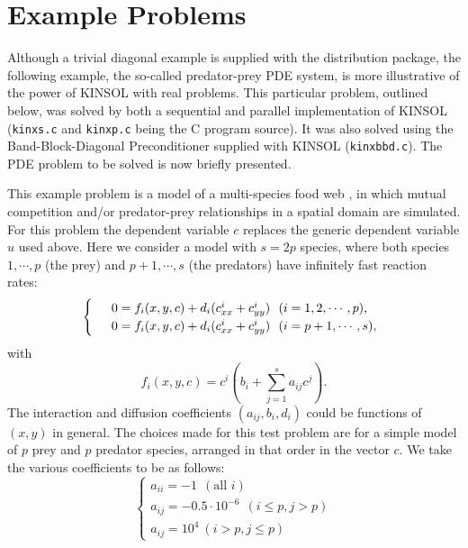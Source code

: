 \section{Example Problems}


Although a trivial diagonal example is supplied with the distribution package, 
the following example,  the so-called predator-prey PDE system, is more 
illustrative of the power of KINSOL with real problems. This particular 
problem, outlined below, was solved by both a sequential and parallel
implementation of KINSOL ({\tt kinxs.c} and {\tt kinxp.c} being the C program 
source). It was also solved using the Band-Block-Diagonal Preconditioner 
supplied with KINSOL ({\tt kinxbbd.c}). The PDE problem to be solved is now 
briefly presented.

This example problem is a model of a multi-species food web \cite{Br86},
in which mutual competition and/or predator-prey relationships in a
spatial domain are simulated. For this problem the dependent variable $c$ 
replaces the generic dependent variable $u$ used above. Here we consider a 
model with $s = 2p$ species, where both species $1,\cdots , p$ (the
prey) and $p+1,\cdots, s$ (the predators) have infinitely fast reaction
rates:
\begin{equation}
\renewcommand{\arraystretch}{1.2}
\left\{
\begin{array}{l}
               \hspace*{1em}  0 = f_i(x,y,c) + d_i 
( c^i_{xx} + c^i_{yy} ) ~ ~ (i = 1,2,\cdots,p) , \\
               \hspace*{1em}  0 = f_i(x,y,c) + d_i 
( c^i_{xx} + c^i_{yy} ) ~ ~ (i = p+1,\cdots,s) ,
\end{array} \right.  \label{5.3}
\end{equation}
with
\begin{equation}
f_i(x,y,c) = c^i (b_i + \sum_{j = 1}^s a_{ij} c^j).
\end{equation}
The interaction and diffusion coefficients $(a_{ij},b_i,d_i)$
could be functions of $(x,y)$ in general. The choices made for
this test problem are for a simple model of $p$ prey and $p$
predator species, arranged in that order in the vector $c$.  We
take the various coefficients to be as follows:
\begin{equation}
\left\{
\begin{array}{l}
a_{ii} = -1 ~ ~ (\mbox{all } i) \\
a_{ij} = -0.5 \cdot 10^{-6} ~ ~ ( i \leq p , j > p )
\\
a_{ij} = 10^4 ~ ( i > p , j \leq p )
\end{array}  \right.
\end{equation}
